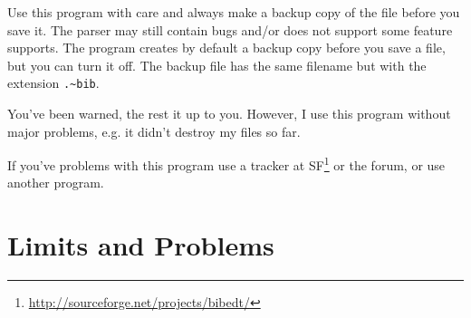 \documentclass[oneside,10pt]{article}
\begin{document}
Use this program with care and always make a backup copy of the file before you
save it. The parser may still contain bugs and/or does not support some feature
\BibTeX{} supports. The program creates by default a backup copy before you save
a file, but you can turn it off. The backup file has the same filename but with
the extension \verb|.~bib|.

You've been warned, the rest it up to you. However, I use this program without
major problems, e.g. it didn't destroy my \BibTeX{} files so far.

If you've problems with this program use a tracker at SF\footnote{\url{http://sourceforge.net/projects/bibedt/}}
or the forum, or use another program.

\section{Limits and Problems}
\label{sec:LimitsAndProblems}
\end{document}
